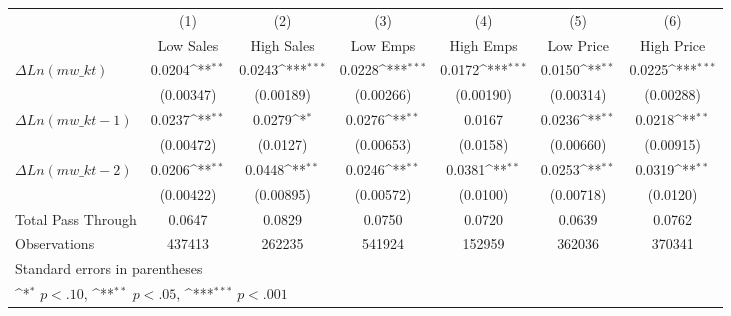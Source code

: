 {
\def\sym#1{\ifmmode^{#1}\else\(^{#1}\)\fi}
\begin{tabular}{l*{6}{c}}
\hline\hline
                    &\multicolumn{1}{c}{(1)}&\multicolumn{1}{c}{(2)}&\multicolumn{1}{c}{(3)}&\multicolumn{1}{c}{(4)}&\multicolumn{1}{c}{(5)}&\multicolumn{1}{c}{(6)}\\
                    &\multicolumn{1}{c}{Low Sales}&\multicolumn{1}{c}{High Sales}&\multicolumn{1}{c}{Low Emps}&\multicolumn{1}{c}{High Emps}&\multicolumn{1}{c}{Low Price}&\multicolumn{1}{c}{High Price}\\
\hline
$\Delta Ln(mw\_kt)$  &      0.0204\sym{**} &      0.0243\sym{***}&      0.0228\sym{***}&      0.0172\sym{***}&      0.0150\sym{**} &      0.0225\sym{***}\\
                    &   (0.00347)         &   (0.00189)         &   (0.00266)         &   (0.00190)         &   (0.00314)         &   (0.00288)         \\
[1em]
$\Delta Ln(mw\_kt-1)$&      0.0237\sym{**} &      0.0279\sym{*}  &      0.0276\sym{**} &      0.0167         &      0.0236\sym{**} &      0.0218\sym{**} \\
                    &   (0.00472)         &    (0.0127)         &   (0.00653)         &    (0.0158)         &   (0.00660)         &   (0.00915)         \\
[1em]
$\Delta Ln(mw\_{kt-2}) $&      0.0206\sym{**} &      0.0448\sym{**} &      0.0246\sym{**} &      0.0381\sym{**} &      0.0253\sym{**} &      0.0319\sym{**} \\
                    &   (0.00422)         &   (0.00895)         &   (0.00572)         &    (0.0100)         &   (0.00718)         &    (0.0120)         \\
\hline
Total Pass Through & 0.0647 & 0.0829 & 0.0750 & 0.0720 & 0.0639 & 0.0762 \\
Observations        &      437413         &      262235         &      541924         &      152959         &      362036         &      370341         \\
\hline\hline
\multicolumn{7}{l}{\footnotesize Standard errors in parentheses}\\
\multicolumn{7}{l}{\footnotesize \sym{*} \(p<.10\), \sym{**} \(p<.05\), \sym{***} \(p<.001\)}\\
\end{tabular}
}
